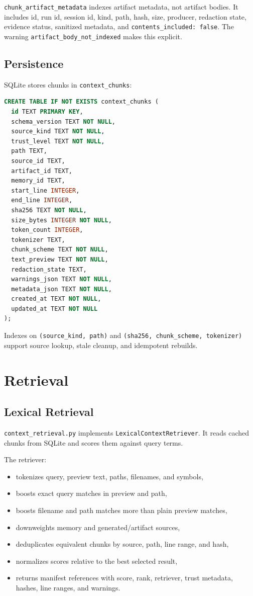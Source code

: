 \documentclass[11pt]{article}
\begin{document}
\texttt{chunk\_artifact\_metadata} indexes artifact metadata, not artifact bodies. It includes id, run id, session id, kind, path, hash, size, producer, redaction state, evidence status, sanitized metadata, and \texttt{contents\_included: false}. The warning \texttt{artifact\_body\_not\_indexed} makes this explicit.

\subsection{Persistence}

SQLite stores chunks in \texttt{context\_chunks}:

\begin{lstlisting}[language=SQL]
CREATE TABLE IF NOT EXISTS context_chunks (
  id TEXT PRIMARY KEY,
  schema_version TEXT NOT NULL,
  source_kind TEXT NOT NULL,
  trust_level TEXT NOT NULL,
  path TEXT,
  source_id TEXT,
  artifact_id TEXT,
  memory_id TEXT,
  start_line INTEGER,
  end_line INTEGER,
  sha256 TEXT NOT NULL,
  size_bytes INTEGER NOT NULL,
  token_count INTEGER,
  tokenizer TEXT,
  chunk_scheme TEXT NOT NULL,
  text_preview TEXT NOT NULL,
  redaction_state TEXT,
  warnings_json TEXT NOT NULL,
  metadata_json TEXT NOT NULL,
  created_at TEXT NOT NULL,
  updated_at TEXT NOT NULL
);
\end{lstlisting}

Indexes on \texttt{(source\_kind, path)} and \texttt{(sha256, chunk\_scheme, tokenizer)} support source lookup, stale cleanup, and idempotent rebuilds.

\section{Retrieval}

\subsection{Lexical Retrieval}

\texttt{context\_retrieval.py} implements \texttt{LexicalContextRetriever}. It reads cached chunks from SQLite and scores them against query terms.

The retriever:

\begin{itemize}[leftmargin=*]
  \item tokenizes query, preview text, paths, filenames, and symbols,
  \item boosts exact query matches in preview and path,
  \item boosts filename and path matches more than plain preview matches,
  \item downweights memory and generated/artifact sources,
  \item deduplicates equivalent chunks by source, path, line range, and hash,
  \item normalizes scores relative to the best selected result,
  \item returns manifest references with score, rank, retriever, trust metadata, hashes, line ranges, and warnings.
\end{itemize}
\end{document}
